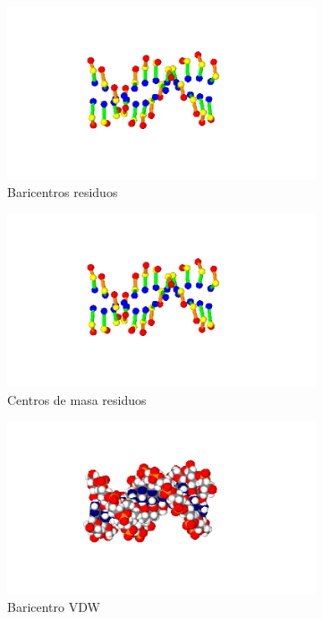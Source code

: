 \begin{figure}
\centering
\begin{subfigure}{.4\textwidth}
  \centering
  \includegraphics[width=.78\linewidth]{./Figures/1fzxresid.png}
  \caption{Baricentros residuos}
  \label{fig:sub111}
\end{subfigure}%
\begin{subfigure}{.4\textwidth}
  \centering
  \includegraphics[width=.78\linewidth]{./Figures/1fzxresid.png}
  \caption{Centros de masa residuos}
  \label{fig:sub222}
\end{subfigure}
\begin{subfigure}{.4\textwidth}
  \centering
  \includegraphics[width=.78\linewidth]{./Figures/1fzxvdw.png}
  \caption{Baricentro VDW}
  \label{fig:sub333}
\end{subfigure}%
\begin{subfigure}{.4\textwidth}

\end{subfigure}
\end{figure}
